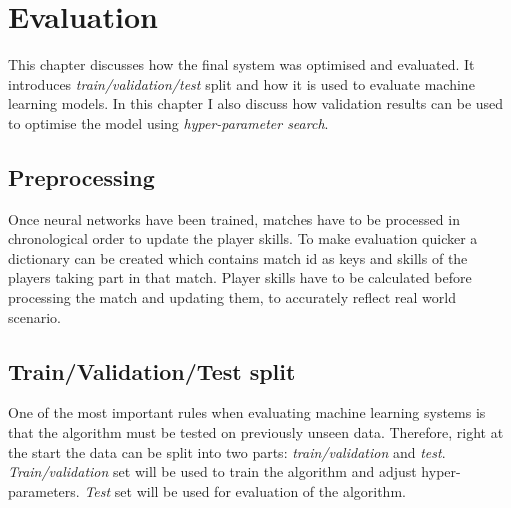 \documentclass[12pt,a4paper]{book}
\begin{document}
\chapter{Evaluation}
This chapter discusses how the final system was optimised and evaluated.
It introduces \emph{train/validation/test} split and how it is used to evaluate machine learning models.
In this chapter I also discuss how validation results can be used to optimise the model using \emph{hyper-parameter search}.

\section{Preprocessing}
Once neural networks have been trained, matches have to be processed in chronological order to update the player skills.
To make evaluation quicker a dictionary can be created which contains match id as keys and skills of the players taking part in that match.
Player skills have to be calculated before processing the match and updating them, to accurately reflect real world scenario.
\section{Train/Validation/Test split}
One of the most important rules when evaluating machine learning systems is that the algorithm must be tested on previously unseen data.
Therefore, right at the start the data can be split into two parts: \emph{train/validation} and \emph{test}.
\emph{Train/validation} set will be used to train the algorithm and adjust hyper-parameters.
\emph{Test} set will be used for evaluation of the algorithm.
\end{document}
